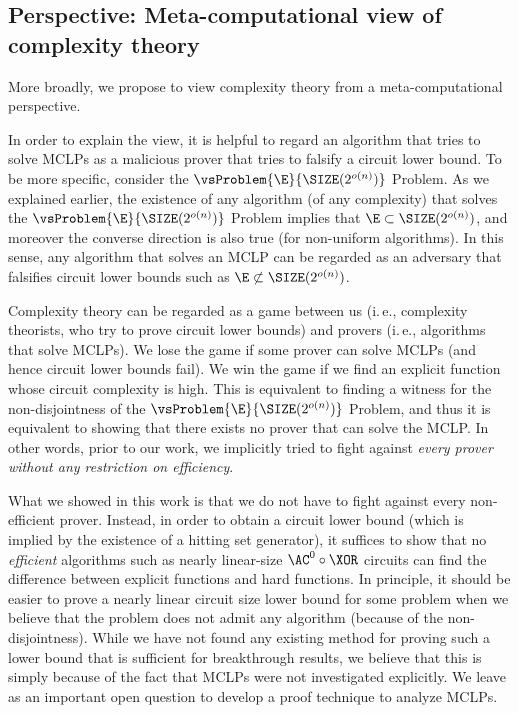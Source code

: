 \documentclass[11pt]{article}
\numberwithin{equation}{section}
\theoremstyle{definition}
\theoremstyle{plain}
\newcommand{\ie}{i.\,e.}
\begin{document}
\subsection{Perspective: Meta-computational view of complexity theory}

More broadly, we propose to view complexity theory from a meta-computational perspective.
%

In order to explain the view, it is helpful to regard an algorithm that tries to solve MCLPs
as a malicious prover that tries to falsify a circuit lower bound.
To be more specific, consider the $\vsProblem{\E}{\SIZE(2^{o(n)})}$ Problem.
As we explained earlier,
the existence of
any algorithm (of any complexity) that solves the $\vsProblem{\E}{\SIZE(2^{o(n)})}$ Problem
implies that $\E \subset \SIZE(2^{o(n)})$,
and moreover the converse direction is also true (for non-uniform algorithms).
In this sense, any algorithm that solves an MCLP can be regarded as an adversary that falsifies circuit lower bounds such as $\E \not\subset \SIZE(2^{o(n)})$.

Complexity theory can be regarded as a game between us (\ie, complexity theorists, who try to prove circuit lower bounds) and provers (\ie, algorithms that solve MCLPs).
We lose the game if some prover can solve MCLPs (and hence circuit lower bounds fail).
We win the game if we find an explicit function whose circuit complexity is high.
This is equivalent to finding a witness for the non-disjointness of the $\vsProblem{\E}{\SIZE(2^{o(n)})}$ Problem,
and thus it is equivalent to showing that there exists no prover that can solve the MCLP.
In other words,
prior to our work,
we implicitly tried to fight against \emph{every prover without any restriction on efficiency}.

What we showed in this work is that we do not have to fight against every non-efficient prover.
Instead,
in order to obtain a circuit lower bound (which is implied by the existence of a hitting set generator),
it suffices to show that no \emph{efficient} algorithms such as nearly linear-size $\AC^0 \circ \XOR$ circuits
can find
the difference between explicit functions and hard functions.
In principle,
it should be easier to prove a nearly linear circuit size lower bound for some problem
when we believe that the problem does not admit any algorithm (because of the non-disjointness).
While we have not found any existing method for proving such a lower bound that is sufficient for breakthrough results,
we believe that this is simply because of the fact that MCLPs were not investigated explicitly.
We leave as an important open question to develop a proof technique to analyze MCLPs.
\end{document}
